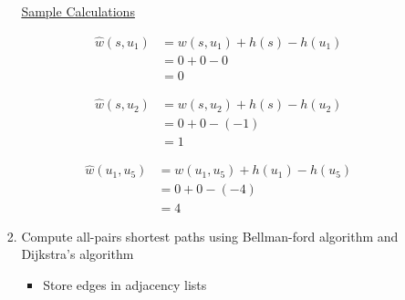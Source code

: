 \documentclass[12pt]{article}
\begin{document}
\begin{enumerate}[1.]
\begin{itemize}
\begin{enumerate}[1.]
            \bigskip

            \underline{Sample Calculations}

            \begin{align}
            \hat{w}(s, u_1) &= w(s, u_1) + h(s) - h(u_1)\\
            &= 0 + 0 - 0\\
            &= 0
            \end{align}

            \bigskip

            \begin{align}
            \hat{w}(s, u_2) &= w(s, u_2) + h(s) - h(u_2)\\
            &= 0 + 0 - (-1)\\
            &= 1
            \end{align}

            \bigskip

            \begin{align}
            \hat{w}(u_1, u_5) &= w(u_1, u_5) + h(u_1) - h(u_5)\\
            &= 0 + 0 - (-4)\\
            &= 4
            \end{align}

            \item Compute all-pairs shortest paths using Bellman-ford algorithm and Dijkstra's algorithm
            \begin{itemize}
                \item Store edges in adjacency lists
            \end{itemize}

            \bigskip


\end{enumerate}
\end{itemize}
\end{enumerate}
\end{document}
